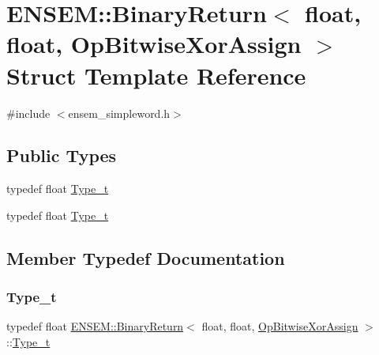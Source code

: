 \hypertarget{structENSEM_1_1BinaryReturn_3_01float_00_01float_00_01OpBitwiseXorAssign_01_4}{}\section{E\+N\+S\+EM\+:\+:Binary\+Return$<$ float, float, Op\+Bitwise\+Xor\+Assign $>$ Struct Template Reference}
\label{structENSEM_1_1BinaryReturn_3_01float_00_01float_00_01OpBitwiseXorAssign_01_4}


{\ttfamily \#include $<$ensem\+\_\+simpleword.\+h$>$}

\subsection*{Public Types}
\begin{DoxyCompactItemize}
\item 
typedef float \mbox{\hyperlink{structENSEM_1_1BinaryReturn_3_01float_00_01float_00_01OpBitwiseXorAssign_01_4_a6716df2454c53484524a0d243395b2ed}{Type\+\_\+t}}
\item 
typedef float \mbox{\hyperlink{structENSEM_1_1BinaryReturn_3_01float_00_01float_00_01OpBitwiseXorAssign_01_4_a6716df2454c53484524a0d243395b2ed}{Type\+\_\+t}}
\end{DoxyCompactItemize}


\subsection{Member Typedef Documentation}
\mbox{\label{structENSEM_1_1BinaryReturn_3_01float_00_01float_00_01OpBitwiseXorAssign_01_4_a6716df2454c53484524a0d243395b2ed}} 
\subsubsection{\texorpdfstring{Type\_t}{Type\_t}\hspace{0.1cm}{\footnotesize\ttfamily [1/2]}}
{\footnotesize\ttfamily typedef float \mbox{\hyperlink{structENSEM_1_1BinaryReturn}{E\+N\+S\+E\+M\+::\+Binary\+Return}}$<$ float, float, \mbox{\hyperlink{structENSEM_1_1OpBitwiseXorAssign}{Op\+Bitwise\+Xor\+Assign}} $>$\+::\mbox{\hyperlink{structENSEM_1_1BinaryReturn_3_01float_00_01float_00_01OpBitwiseXorAssign_01_4_a6716df2454c53484524a0d243395b2ed}{Type\+\_\+t}}}

